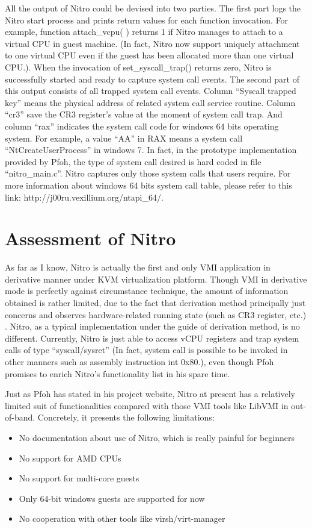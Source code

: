 All the output of Nitro could be devised into two parties. 
The first part logs the Nitro start process and prints return values for each function invocation. 
For example, function attach\_vcpu( ) returns 1 if Nitro manages to attach to a virtual CPU in guest machine.
(In fact, Nitro now support uniquely attachment to one virtual CPU even if the guest has been allocated more than one virtual CPU.). 
When the invocation of set\_syscall\_trap() returns zero, Nitro is successfully started and ready to capture system call events.
The second part of this output consists of all trapped system call events. Column “Syscall trapped key” means the physical address of 
related system call service routine. Column “cr3” save the CR3 register’s value at the moment of system call trap. And column “rax” 
indicates the system call code for windows 64 bits operating system. For example, a value “AA” in RAX means a system call 
“NtCreateUserProcess” in windows 7. In fact, in the prototype implementation provided by Pfoh, the type of system call desired is 
hard coded in file “nitro\_main.c”. Nitro captures only those system calls that users require.  
For more information about windows 64 bits system call table, please refer to this link: http://j00ru.vexillium.org/ntapi\_64/.

\section{Assessment of Nitro}
As far as I know, Nitro is actually the first and only VMI application in derivative manner under KVM virtualization platform. 
Though VMI in derivative mode is perfectly against circumstance technique, the amount of information obtained is rather limited, 
due to the fact that derivation method principally just concerns and observes hardware-related running state (such as CR3 register, etc.)
\cite{Reference17}. Nitro, as a typical implementation under the guide of derivation method, is no different. Currently, Nitro is just able to access vCPU 
registers and trap system calls of type “syscall/sysret” (In fact, system call is possible to be invoked in other manners such as assembly instruction int 0x80.), 
even though Pfoh promises to enrich Nitro’s functionality list in his spare time.

Just as Pfoh has stated in his project website, Nitro at present has a relatively limited suit of functionalities compared with 
those VMI tools like LibVMI in out-of-band. Concretely, it presents the following limitations:
\begin{itemize}
    \item No documentation about use of Nitro, which is really painful for beginners
    \item No support for AMD CPUs
    \item No support for multi-core guests
    \item Only 64-bit windows guests are supported for now
    \item No cooperation with other tools like virsh/virt-manager
\end{itemize}

